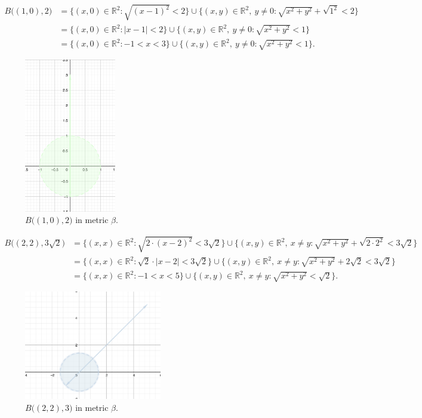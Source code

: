 \documentclass[a4paper,11pt]{article}
\begin{document}

\begin{align*} 
    B \big((1, 0), 2 \big) &= \{(x,0) \in \mathbb{R}^2 : \sqrt{(x - 1)^2} < 2 \} \cup \{(x, y) \in \mathbb{R}^2, \ y \neq 0 : \sqrt{x^2 + y^2} + \sqrt{1^2} < 2 \}
    \\
    &= \{(x,0) \in \mathbb{R}^2 : |x - 1| < 2 \} \cup \{(x,y) \in \mathbb{R}^2, \ y \neq 0 : \sqrt{x^2 + y^2} < 1 \} 
    \\
    &= \{(x,0) \in \mathbb{R}^2 : -1 < x < 3 \} \cup \{(x,y) \in \mathbb{R}^2, \ y \neq 0 : \sqrt{x^2 + y^2} < 1 \} .
\end{align*}

\begin{figure}[ht!]
    \centering
    \includegraphics[width=40mm]{c2.png}
    \caption{$B \big((1, 0), 2 \big)$ in metric $\beta$.}
\end{figure}


\begin{align*} 
    B \big((2, 2), 3 \sqrt{2} \big) &= \{(x,x) \in \mathbb{R}^2 : \sqrt{2 \cdot (x - 2)^2} < 3 \sqrt{2} \} \cup \{(x, y) \in \mathbb{R}^2, \ x \neq y : \sqrt{x^2 + y^2} + \sqrt{2 \cdot 2^2} < 3 \sqrt{2} \}
    \\
    &= \{(x,x) \in \mathbb{R}^2 : \sqrt{2} \cdot |x - 2| < 3 \sqrt{2} \} \cup \{(x,y) \in \mathbb{R}^2, \ x \neq y : \sqrt{x^2 + y^2} + 2 \sqrt{2} < 3 \sqrt{2} \} 
    \\
    &= \{(x,x) \in \mathbb{R}^2 : -1 < x < 5\} \cup \{(x,y) \in \mathbb{R}^2, \ x \neq y : \sqrt{x^2 + y^2} < \sqrt{2} \} .
\end{align*}

\begin{figure}[ht!]
    \centering
    \includegraphics[width=60mm]{c3.png}
    \caption{$B \big((2, 2), 3 \big)$ in metric $\beta$.}
\end{figure}
\end{document}
